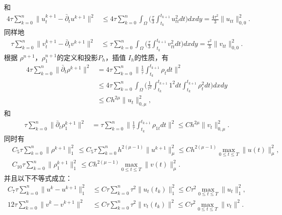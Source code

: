 \documentclass[twoside,UTF8]{nputhesis}
\begin{document}
和
\begin{equation}
\begin{split}
4\tau\sum^n_{k=0}\| u^{k+1}_t-\bar{\partial}_tu^{k+1}\|^2&\leq4\tau\sum^n_{k=0}\int_\Omega\Big(\frac{\tau}{3}\int^{t_{k+1}}_{t_k}u^2_{tt}dt\Big)dxdy=\frac{4\tau^2}{3}\| u_{tt}\|^2_{0,0}.
\label{52}
\end{split}
\end{equation}
同样地
\begin{equation}
\begin{split}
\tau\sum^n_{k=0}\| v^{k+1}_t-\bar{\partial}_tv^{k+1}\|^2&\leq\tau\sum^n_{k=0}\int_\Omega\Big(\frac{\tau}{3}\int^{t_{k+1}}_{t_k}v^2_{tt}dt\Big)dxdy
=\frac{\tau^2}{3}\| v_{tt}\|^2_{0,0}.
\label{53}
\end{split}
\end{equation}
根据 $\rho^{n+1}$，$\rho_1^{n+1}$的定义和投影$P_h$，插值 $I_h$的性质，有
\begin{equation}
\begin{split}
4\tau\sum^n_{k=0}\| \bar{\partial}_t\rho^{k+1}\|^2&=4\tau\sum^n_{k=0}\| \frac{1}{\tau}\int^{t_{k+1}}_{t_k}\rho_tdt\|^2\\
&\leq4\tau\sum^n_{k=0}\int_\Omega\Big(\frac{1}{\tau^2}\int^{t_{k+1}}_{t_k}1^2dt\int^{t_{k+1}}_{t_k}\rho^2_tdt\Big)dxdy\\
&\leq Ch^{2\mu}\| u_t\|^2_{0,\mu},
\label{54}
\end{split}
\end{equation}
和
\begin{equation}
\begin{split}
\tau\sum^n_{k=0}\| \bar{\partial}_t\rho_1^{k+1}\|^2&=\tau\sum^n_{k=0}\| \frac{1}{\tau}\int^{t_{k+1}}_{t_k}\rho_{1t}dt\|^2\leq Ch^{2\mu}\| v_t\|^2_{0,\mu}.
\label{55}
\end{split}
\end{equation}
同时有
\begin{equation}
\begin{split}
&C_5\tau\sum^n_{k=0}\| \rho^{k+1}\|^2_1
\,\leq C_5\tau\sum^n_{k=0}h^{2(\mu-1)}\| u^{k+1}\|^2_\mu\leq Ch^{2(\mu-1)}\max\limits_{0\leq t\leq T}\| u(t)\|^2_\mu,\\
&C_{10}\tau\sum^n_{k=0}\| \rho_1^{k+1}\|^2_1\,\leq Ch^{2(\mu-1)}\max\limits_{0\leq t\leq T}\| v(t)\|^2_\mu.
\label{56}
\end{split}
\end{equation}
并且以下不等式成立：
\begin{equation}
\begin{split}
C_7 \tau\sum^n_{k=0}\| u^k-u^{k+1}\|^2_1&\leq C\tau\sum^n_{k=0}\tau^2\| u_t(t_k)\|^2_1\leq C\tau^2\max_{0\leq t\leq T}\| u_t\|^2_1, \\
12\tau \sum^n_{k=0}\| v^k-v^{k+1}\|^2&\leq C\tau \sum^n_{k=0}\tau^2\| v_t(t_k)\|^2\leq C\tau^2\max_{0\leq t\leq T}\| v_t\|^2.
\label{57}
\end{split}
\end{equation}
\end{document}
